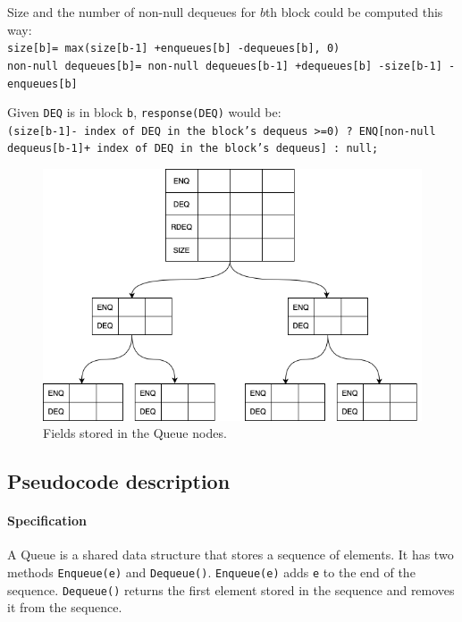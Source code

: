 \documentclass[10pt]{article}
\theoremstyle{definition}
\newtheorem{definition}[theorem]{Definition}
\begin{document}
%  
%  

Size and the number of non-null dequeues for $b$th block could be computed this way:\\
\texttt{size[b]= max(size[b-1] +enqueues[b] -dequeues[b], 0)}\\
\texttt{non-null dequeues[b]= non-null dequeues[b-1] +dequeues[b] -size[b-1] -enqueues[b]}

Given \texttt{DEQ} is in block \texttt{b}, \texttt{response(DEQ)} would be:\\
\texttt{(size[b-1]- index of DEQ in the block's dequeus >=0) ? ENQ[non-null dequeus[b-1]+ index of DEQ in the block's dequeus] : null;}


\begin{figure}[hbt]
\centering
  \includegraphics[width=5in]{pics/queue}
  \caption{Fields stored in the Queue nodes. \label{fig::queue}}
\end{figure}


\subsection{Pseudocode description}

\paragraph{Specification}
A Queue is a shared data structure that stores a sequence of elements. It has two methods \texttt{Enqueue(e)} and \texttt{Dequeue()}. \texttt{Enqueue(e)} adds \texttt{e} to the end of the sequence. \texttt{Dequeue()} returns the first element stored in the sequence and removes it from the sequence.
\end{document}
